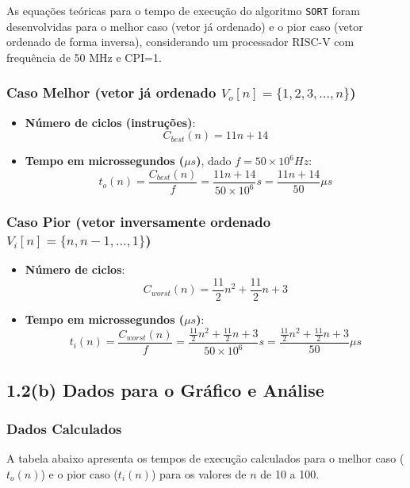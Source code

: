 \documentclass[12pt,a4paper]{article}
\begin{document}
As equações teóricas para o tempo de execução do algoritmo \texttt{SORT} foram desenvolvidas para o melhor caso (vetor já ordenado) e o pior caso (vetor ordenado de forma inversa), considerando um processador RISC-V com frequência de 50 MHz e CPI=1.

\subsubsection*{Caso Melhor (vetor já ordenado $V_{o}[n]=\{1,2,3,...,n\}$)}
\begin{itemize}
    \item \textbf{Número de ciclos (instruções)}:
    $$ C_{best}(n) = 11n + 14 $$
    \item \textbf{Tempo em microssegundos ($\mu s$)}, dado $f=50 \times 10^{6} Hz$:
    $$ t_{o}(n) = \frac{C_{best}(n)}{f} = \frac{11n + 14}{50 \times 10^{6}}s = \frac{11n + 14}{50}\mu s $$
\end{itemize}

\subsubsection*{Caso Pior (vetor inversamente ordenado $V_{i}[n]=\{n,n-1,...,1\}$)}
\begin{itemize}
    \item \textbf{Número de ciclos}:
    $$ C_{worst}(n) = \frac{11}{2}n^{2} + \frac{11}{2}n + 3 $$
    \item \textbf{Tempo em microssegundos ($\mu s$)}:
    $$ t_{i}(n) = \frac{C_{worst}(n)}{f} = \frac{\frac{11}{2}n^{2} + \frac{11}{2}n + 3}{50 \times 10^{6}}s = \frac{\frac{11}{2}n^{2} + \frac{11}{2}n + 3}{50}\mu s $$
\end{itemize}

\subsection*{1.2(b) Dados para o Gráfico e Análise}

\subsubsection*{Dados Calculados}
A tabela abaixo apresenta os tempos de execução calculados para o melhor caso ($t_o(n)$) e o pior caso ($t_i(n)$) para os valores de $n$ de 10 a 100.
\end{document}
